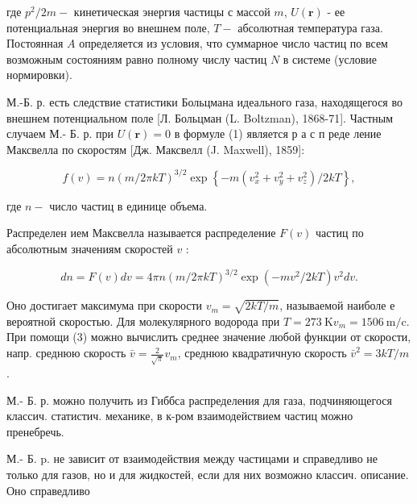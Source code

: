 \documentclass[10pt]{article}
\begin{document}
где $p^{2} / 2 m-$ кинетическая энергия частицы с массой $m$, $U(\boldsymbol{r})$ - ее потенциальная энергия во внешнем поле, $T-$ абсолютная температура газа. Постоянная $A$ определяется из условия, что суммарное число частиц по всем возможным состояниям равно полному числу частиц $N$ в системе (условие нормировки).



М.-Б. р. есть следствие статистики Больцмана идеального газа, находящегося во внешнем потенциальном поле [Л. Больцман (L. Boltzman), 1868-71]. Частным случаем М.- Б. р. при $U(\boldsymbol{r})=0$ в формуле (1) является р а с п реде ление Максвелла по скоростям [Дж. Максвелл (J. Maxwell), 1859]:



\[

f(v)=n(m / 2 \pi k T)^{3 / 2} \exp \left\{-m\left(v_{x}^{2}+v_{y}^{2}+v_{z}^{2}\right) / 2 k T\right\},

\]



где $n-$ число частиц в единице объема.



Распределен ием Максвелла называется распределение $F(v)$ частиц по абсолютным значениям скоростей $v$ :



\[

d n=F(v) d v=4 \pi n(m / 2 \pi k T)^{3 / 2} \exp \left(-m v^{2} / 2 k T\right) v^{2} d v .

\]



Оно достигает максимума при скорости $v_{m}=\sqrt{2 k T / m}$, называемой наиболе е вероятной скоростью. Для молекулярного водорода при $T=273 \mathrm{~K} v_{m}=1506 \mathrm{~m} / \mathrm{c}$. При помощи (3) можно вычислить среднее значение любой функции от скорости, напр. среднюю скорость $\bar{v}=\frac{2}{\sqrt{\pi}} v_{m}$, среднюю квадратичную скорость $\bar{v}^{2}=3 k T / m$.



М.- Б. р. можно получить из Гиббса распределения для газа, подчиняющегося классич. статистич. механике, в к-ром взаимодействием частиц можно пренебречь.



М.- Б. p. не зависит от взаимодействия между частицами и справедливо не только для газов, но и для жидкостей, если для них возможно классич. описание. Оно справедливо
\end{document}
